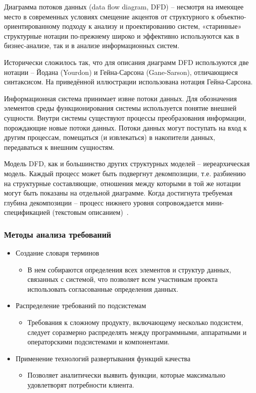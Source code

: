 \documentclass{../industrial-development}
\begin{document}
\lecturenotes

\alert{Диаграмма потоков данных} (data flow diagram, DFD) – несмотря на имеющее место в современных условиях смещение акцентов от структурного к объектно-ориентированному подходу к анализу и проектированию систем, «старинные» структурные нотации по-прежнему
широко и эффективно используются как в бизнес-анализе, так и в анализе информационных систем.

Исторически сложилось так, что для описания диаграмм DFD используются две нотации – Йодана (Yourdon) и Гейна-Сарсона (Gane-Sarson), отличающиеся синтаксисом. На приведённой иллюстрации использована нотация Гейна-Сарсона.

Информационная система принимает извне потоки данных. Для обозначения элементов среды функционирования системы используется понятие внешней сущности. Внутри системы существуют процессы преобразования информации, порождающие новые потоки данных. Потоки данных могут поступать на вход к другим процессам, помещаться (и извлекаться) в накопители данных, передаваться к внешним сущностям.

Модель DFD, как и большинство других структурных моделей – иереархическая модель. Каждый процесс может быть подвергнут декомпозиции, т.е. разбиению на структурные составляющие, отношения между которыми в той же нотации могут быть показаны на отдельной диаграмме. Когда достигнута требуемая глубина декомпозиции – процесс нижнего уровня сопровождается мини-спецификацией (текстовым описанием)~\cite[с.~48-49]{Maglinec}.


\begin{frame} \frametitle{Методы анализа требований}
\begin{itemize}
\item  \alert{Создание словаря терминов}
\begin{itemize}
\item  В нем собираются определения всех элементов и структур данных, связанных с системой, что позволяет всем участникам проекта использовать согласованные определения данных.
\end{itemize}
\item \alert{Распределение требований по подсистемам} 
\begin{itemize}
\item Требования к сложному продукту, включающему несколько подсистем, следует соразмерно распределять между программными, аппаратными и операторскими подсистемами и компонентами.
\end{itemize}
\item \alert{Применение технологий развертывания функций качества}
\begin{itemize}
\item Позволяет аналитически выявить функции, которые максимально удовлетворят потребности клиента.
\end{itemize}
\end{itemize}
\end{frame}
\end{document}
